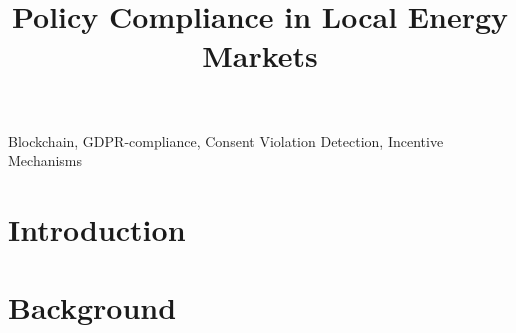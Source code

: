 \documentclass[conference]{IEEEtran}
\begin{document}
	\title{Policy Compliance in Local Energy Markets}

	\author{
	}


	\maketitle

	\begin{abstract}
	\end{abstract}

	\begin{IEEEkeywords}
		Blockchain, GDPR-compliance, Consent Violation Detection, Incentive Mechanisms
	\end{IEEEkeywords}

	\section{Introduction}
	\label{sec:introduction}
	

	\section{Background}
	\label{sec:preliminaries}
	
\end{document}
